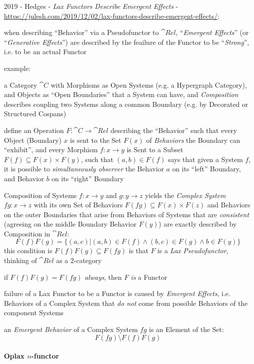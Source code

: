 2019 - Hedges - \emph{Lax Functors Describe Emergent Effects} -
\url{https://julesh.com/2019/12/02/lax-functors-describe-emergent-effects/}:

when describing ``Behavior'' via a Pseudofunctor to $\cat{Rel}$,
``\emph{Emergent Effects}'' (or ``\emph{Generative Effects}'') are described by
the feailure of the Functor to be ``\emph{Strong}'', i.e. to be an actual
Functor

example:

a Category $\cat{C}$ with Morphisms as Open Systems (e.g. a Hypergraph
Category), and Objects as ``Open Boundaries'' that a System can have, and
\emph{Composition} describes coupling two Systems along a common Boundary (e.g.
by Decorated or Structured Cospans)

define an Operation $F : \cat{C} \rightarrow \cat{Rel}$ describing the
``Behavior'' such that every Object (Boundary) $x$ is sent to the Set $F(x)$ of
\emph{Behaviors} the Boundary can ``exhibit'', and every Morphism
$f : x \rightarrow y$ is Sent to a Subset $F(f) \subseteq F(x) \times F(y)$,
such that $(a, b) \in F(f)$ says that given a System $f$, it is possible to
\emph{simultaneously observer} the Behavior $a$ on its ``left'' Boundary, and
Behavior $b$ on its ``right'' Boundary

Composition of Systems $f : x \rightarrow y$ and $g : y \rightarrow z$ yields
the \emph{Complex System} $f g : x \rightarrow z$ with its own Set of Behaviors
$F(fg) \subseteq F(x) \times F(z)$ and Behaviors on the outer Boundaries that
arise from Behaviors of Systems that are \emph{consistent} (agreeing on the
middle Boundary Behavior $F(y)$) are exactly described by Composition in
$\cat{Rel}$:
\[
  F(f) F(g) = \{(a,c) | (a,b) \in F(f) \wedge (b,c) \in F(g) \wedge b \in F(y)\}
\]
this condition is $F(f) F(g) \subseteq F(fg)$ is that $F$ is a
\emph{Lax Pseudofunctor}, thinking of $\cat{Rel}$ as a $2$-category

if $F(f) F(g) = F(fg)$ \emph{always}, then $F$ \emph{is} a Functor

failure of a Lax Functor to be a Functor is caused by \emph{Emergent Effects},
i.e. Behaviors of a Complex System that \emph{do not} come from possible
Behaviors of the component Systems

an \emph{Emergent Behavior} of a Complex System $f g$ is an Element of the Set:
\[
  F(fg) \setminus F(f) F(g)
\]



\paragraph{Oplax $n$-functor}\label{sec:oplax_n_functor}\hfill



